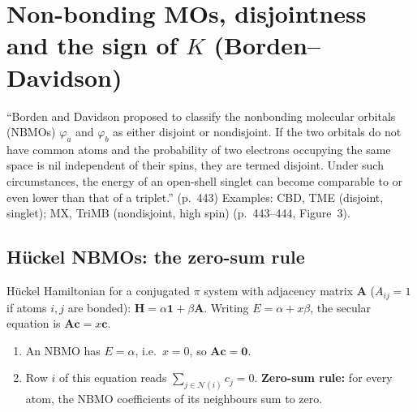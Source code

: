 \section{Non-bonding MOs, disjointness and the sign of $K$ (Borden--Davidson)}\label{sec:huckel}

\begin{reviewclaim}
``Borden and Davidson proposed to classify the nonbonding molecular orbitals (NBMOs) $\varphi_a$ and
$\varphi_b$ as either disjoint or nondisjoint. If the two orbitals do not have common atoms and the
probability of two electrons occupying the same space is nil independent of their spins, they are
termed disjoint. Under such circumstances, the energy of an open-shell singlet can become comparable to
or even lower than that of a triplet.'' (p.~443) Examples: CBD, TME (disjoint, singlet); MX, TriMB
(nondisjoint, high spin) (p.~443--444, Figure~3).
\end{reviewclaim}

\subsection{Hückel NBMOs: the zero-sum rule}
Hückel Hamiltonian for a conjugated $\pi$ system with adjacency matrix $\mathbf A$ ($A_{ij}=1$ if atoms
$i,j$ are bonded): $\mathbf H=\alpha\mathbf 1+\beta\mathbf A$. Writing $E=\alpha+x\beta$, the secular equation
is $\mathbf A\mathbf c=x\mathbf c$.
\begin{enumerate}
  \item An NBMO has $E=\alpha$, i.e.\ $x=0$, so $\mathbf A\mathbf c=\mathbf 0$.
  \item Row $i$ of this equation reads $\sum_{j\in\mathcal N(i)}c_j=0$. \textbf{Zero-sum rule:} for every atom, the
        NBMO coefficients of its neighbours sum to zero.
\end{enumerate}

